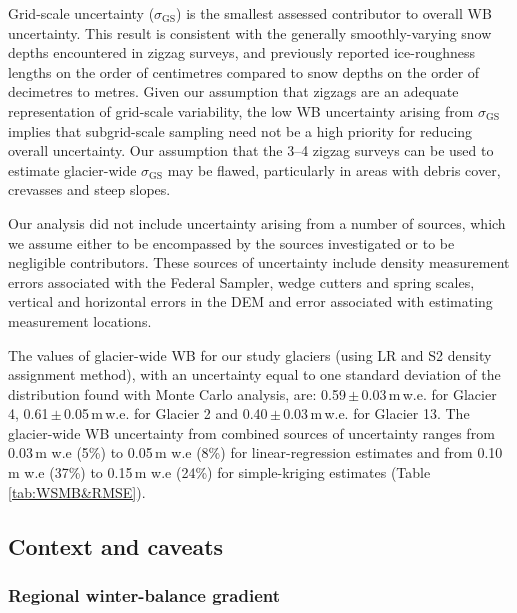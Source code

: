 \documentclass[review,oneside, letterpaper]{igs}
\begin{document}
Grid-scale uncertainty ($\sigma_{\mathrm{GS}}$) is the smallest assessed contributor to overall WB uncertainty. This result is consistent with the generally smoothly-varying snow depths encountered in zigzag surveys, and previously reported ice-roughness lengths on the order of centimetres \citep[e.g.][]{Hock2005} compared to snow depths on the order of decimetres to metres. Given our assumption that zigzags are an adequate representation of grid-scale variability, the low WB uncertainty arising from $\sigma_{\mathrm{GS}}$ implies that subgrid-scale sampling need not be a high priority for reducing overall uncertainty. Our assumption that the 3--4 zigzag surveys can be used to estimate glacier-wide $\sigma_{\mathrm{GS}}$ may be flawed, particularly in areas with debris cover, crevasses and steep slopes.

Our analysis did not include uncertainty arising from a number of sources, which we assume either to be  encompassed by the sources investigated or to be negligible contributors. These sources of uncertainty include density measurement errors associated with the Federal Sampler, wedge cutters and spring scales, vertical and horizontal errors in the DEM and error associated with estimating measurement locations.

The values of glacier-wide WB for our study glaciers (using LR and S2 density assignment method), with an uncertainty equal to one standard deviation of the distribution found with Monte Carlo analysis, are: 0.59\,$\pm$\,0.03\,m\,w.e. for Glacier 4, 0.61\,$\pm$\,0.05\,m\,w.e. for Glacier 2 and 0.40\,$\pm$\,0.03\,m\,w.e. for Glacier 13. The glacier-wide WB uncertainty from combined sources of uncertainty ranges from 0.03\,m w.e (5\%) to 0.05\,m w.e (8\%) for linear-regression estimates and from 0.10\,m w.e (37\%) to 0.15\,m w.e (24\%) for simple-kriging estimates (Table \ref{tab:WSMB&RMSE}).

\subsection{Context and caveats}
\subsubsection{Regional winter-balance gradient}
\end{document}
